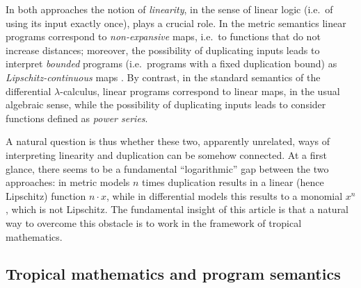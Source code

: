 In both approaches the notion of \emph{linearity}, in the sense of linear logic \cite{linearlogic} (i.e.~of using its input exactly once), plays a crucial role.
In the metric semantics linear programs correspond to \emph{non-expansive} maps, i.e.~to functions that do not increase distances; moreover, the possibility of duplicating inputs leads to interpret \emph{bounded} programs (i.e.~programs with a fixed duplication bound) as \emph{Lipschitz-continuous} maps \cite{Gabo2017}.
By contrast, in the standard semantics of the differential $\lambda$-calculus, linear programs correspond to linear maps, in the usual algebraic sense, while the possibility of duplicating inputs leads to consider functions defined as \emph{power series}.


A natural question is thus whether these two, apparently unrelated, ways of interpreting linearity and duplication can be somehow connected. At a first glance, there seems to be a fundamental ``logarithmic'' gap between the two approaches:
in metric models $n$ times duplication results in a linear (hence Lipschitz) function $n\cdot x$, while in differential models this results to
a monomial $x^{n}$, which is not Lipschitz. The fundamental insight of this article is that a natural way to overcome 
this obstacle 
is to work in the framework of 
tropical mathematics.
%
%
%



\subsection{Tropical mathematics and program semantics } 


